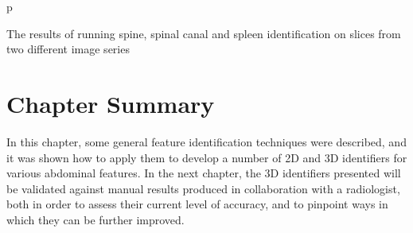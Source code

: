\begin{stusubfig}{p}
	\\
\caption{The results of running spine, spinal canal and spleen identification on slices from two different image series}
\label{fig:featureid-3d-spleenidentification-results}
\end{stusubfig}

\afterpage{\clearpage}
\newpage

\section{Chapter Summary}

In this chapter, some general feature identification techniques were described, and it was shown how to apply them to develop a number of 2D and 3D identifiers for various abdominal features. In the next chapter, the 3D identifiers presented will be validated against manual results produced in collaboration with a radiologist, both in order to assess their current level of accuracy, and to pinpoint ways in which they can be further improved.
